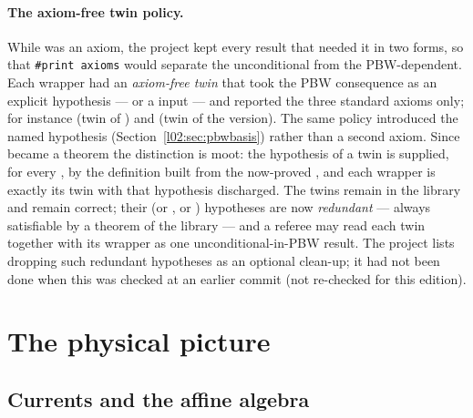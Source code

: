 \paragraph{The axiom-free twin policy.}
While  was an axiom, the project
kept every result that needed it in two forms, so that \texttt{\#print axioms} would separate the
unconditional from the PBW-dependent. Each  wrapper had an \emph{axiom-free twin} that took
the PBW consequence as an explicit hypothesis ---  or a
 input --- and reported the three standard axioms only; for instance
 (twin of \allowbreak{}) and
\allowbreak{}\allowbreak{}\allowbreak{} (twin of the  version). The
same policy introduced the named hypothesis  (Section~\ref{l02:sec:pbwbasis}) rather than a
second axiom. Since  became a theorem the distinction is moot: the hypothesis
 of a twin is supplied, for every
, by the definition \allowbreak{} built from the now-proved
\allowbreak{}, and each  wrapper is exactly its twin with that
hypothesis discharged. The twins remain in the library and remain correct; their  (or
, or ) hypotheses are now \emph{redundant} --- always satisfiable by
a theorem of the library --- and a referee may read each twin together with its  wrapper as
one unconditional-in-PBW result. The project lists dropping such redundant hypotheses as an optional
clean-up; it had not been done when this was checked at an earlier commit (not re-checked for this edition).

\section{The physical picture}\label{l02:sec:physics}

\subsection{Currents and the affine algebra}

